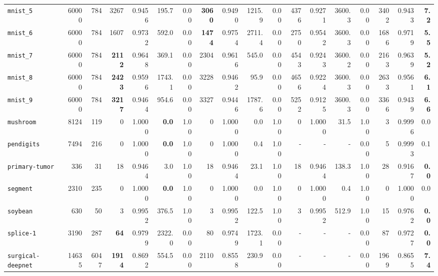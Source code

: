 \begin{tabular}{lccrrrrrrrrrrrrrrr}
\texttt{mnist\_5} & \multicolumn{1}{r}{60000} & \multicolumn{1}{r}{784}  & 3267 & 0.9456 & 195.7 & 0.00 & \textbf{3060} & 0.9490 & 1215.9 & 0.00 & 4376 & 0.9271 & 3600.3 & 0.00 & 3402 & 0.9433 & \textbf{7.2}\\
\texttt{mnist\_6} & \multicolumn{1}{r}{60000} & \multicolumn{1}{r}{784}  & 1607 & 0.9732 & 592.0 & 0.00 & \textbf{1474} & 0.9754 & 2711.4 & 0.00 & 2750 & 0.9542 & 3600.3 & 0.00 & 1686 & 0.9719 & \textbf{5.5}\\
\texttt{mnist\_7} & \multicolumn{1}{r}{60000} & \multicolumn{1}{r}{784}  & \textbf{2112} & 0.9648 & 369.1 & 0.00 & 2304 & 0.9616 & 545.0 & 0.00 & 4543 & 0.9243 & 3600.2 & 0.00 & 2163 & 0.9639 & \textbf{5.2}\\
\texttt{mnist\_8} & \multicolumn{1}{r}{60000} & \multicolumn{1}{r}{784}  & \textbf{2423} & 0.9596 & 1743.1 & 0.00 & 3228 & 0.9462 & 95.9 & 0.00 & 4656 & 0.9224 & 3600.3 & 0.00 & 2633 & 0.9561 & \textbf{6.1}\\
\texttt{mnist\_9} & \multicolumn{1}{r}{60000} & \multicolumn{1}{r}{784}  & \textbf{3217} & 0.9464 & 954.6 & 0.00 & 3327 & 0.9446 & 1787.6 & 0.00 & 5252 & 0.9125 & 3600.3 & 0.00 & 3366 & 0.9439 & \textbf{6.6}\\
\texttt{mushroom} & \multicolumn{1}{r}{8124} & \multicolumn{1}{r}{119}  & 0 & 1.0000 & \textbf{0.0} & 1.00 & 0 & 1.0000 & 0.0 & 1.00 & 0 & 1.0000 & 31.5 & 1.00 & 3 & 0.9996 & 0.0\\
\texttt{pendigits} & \multicolumn{1}{r}{7494} & \multicolumn{1}{r}{216}  & 0 & 1.0000 & \textbf{0.0} & 1.00 & 0 & 1.0000 & 0.4 & 1.00 & - & - & - & 0.00 & 5 & 0.9993 & 0.1\\
\texttt{primary-tumor} & \multicolumn{1}{r}{336} & \multicolumn{1}{r}{31}  & 18 & 0.9464 & 3.0 & 1.00 & 18 & 0.9464 & 23.1 & 1.00 & 18 & 0.9464 & 138.3 & 1.00 & 28 & 0.9167 & \textbf{0.0}\\
\texttt{segment} & \multicolumn{1}{r}{2310} & \multicolumn{1}{r}{235}  & 0 & 1.0000 & \textbf{0.0} & 1.00 & 0 & 1.0000 & 0.0 & 1.00 & 0 & 1.0000 & 0.4 & 1.00 & 0 & 1.0000 & 0.0\\
\texttt{soybean} & \multicolumn{1}{r}{630} & \multicolumn{1}{r}{50}  & 3 & 0.9952 & 376.5 & 1.00 & 3 & 0.9952 & 122.5 & 1.00 & 3 & 0.9952 & 512.9 & 1.00 & 15 & 0.9762 & \textbf{0.0}\\
\texttt{splice-1} & \multicolumn{1}{r}{3190} & \multicolumn{1}{r}{287}  & \textbf{64} & 0.9799 & 2322.0 & 0.00 & 80 & 0.9749 & 1723.1 & 0.00 & - & - & - & 0.00 & 87 & 0.9727 & \textbf{0.0}\\
\texttt{surgical-deepnet} & \multicolumn{1}{r}{14635} & \multicolumn{1}{r}{6047}  & \textbf{1914} & 0.8692 & 554.5 & 0.00 & 2110 & 0.8558 & 230.9 & 0.00 & - & - & - & 0.00 & 1969 & 0.8655 & \textbf{7.4}\\

\end{tabular}
